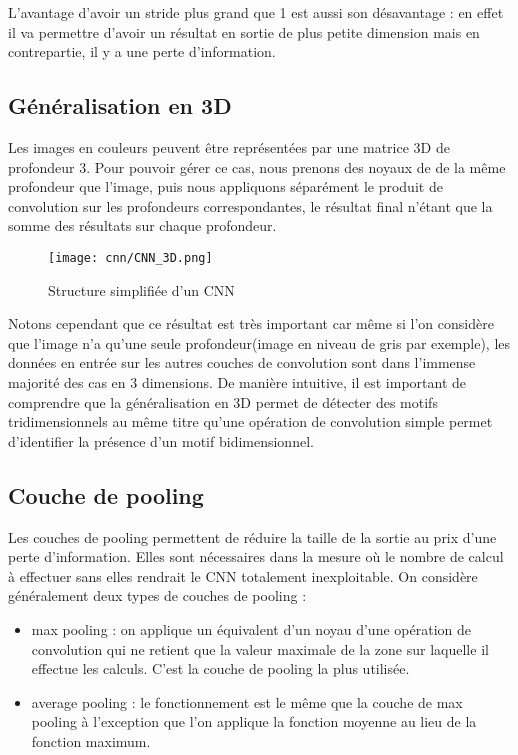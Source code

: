 L'avantage d'avoir un stride plus grand que 1 est aussi son désavantage : en effet il va permettre d'avoir un résultat en sortie de plus petite dimension mais en contrepartie, il y a une perte d'information.

\subsection{Généralisation en 3D}

Les images en couleurs peuvent être représentées par une matrice 3D de profondeur 3. Pour pouvoir gérer ce cas, nous prenons des noyaux de de la même profondeur que l'image, puis nous appliquons séparément le produit de convolution sur les profondeurs correspondantes, le résultat final n'étant que la somme des résultats sur chaque profondeur. 

\begin{figure}[!h]
\centering
\texttt{[image: cnn/CNN\_3D.png]}
\caption{Structure simplifiée d'un CNN}
\end{figure}

Notons cependant que ce résultat est très important car même si l'on considère que l'image n'a qu'une seule profondeur(image en niveau de gris par exemple), les données en entrée sur les autres couches de convolution sont dans l'immense majorité des cas en 3 dimensions. De manière intuitive, il est important de comprendre que la généralisation en 3D permet de détecter des motifs tridimensionnels au même titre qu'une opération de convolution simple permet d'identifier la présence d'un motif bidimensionnel. 

\subsection{Couche de pooling}

Les couches de pooling permettent de réduire la taille de la sortie au prix d'une perte d'information. Elles sont nécessaires dans la mesure où le nombre de calcul à effectuer sans elles rendrait le CNN  totalement inexploitable. On considère généralement deux types de couches de pooling :

\begin{itemize}
 \item max pooling : on applique un équivalent d'un noyau d'une opération de convolution qui ne retient que la valeur maximale de la zone sur laquelle il effectue les calculs. C'est la couche de pooling la plus utilisée.
 
\item average pooling : le fonctionnement est le même que la couche de max pooling à l'exception que l'on applique la fonction moyenne au lieu de la fonction maximum. 
\end{itemize}

